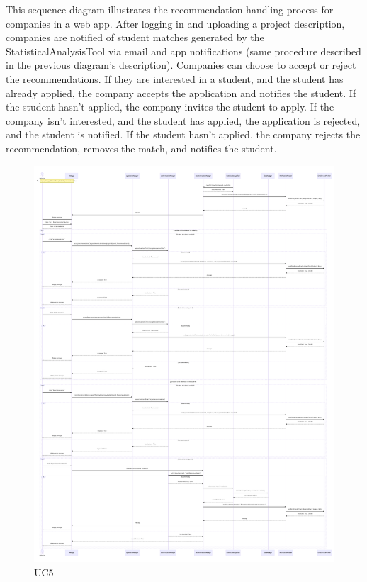 This sequence diagram illustrates the recommendation handling process for companies in a web app. After logging in and uploading a project description, companies are notified of student matches generated by the StatisticalAnalysisTool via email and app notifications (same procedure described in the previous diagram's description). Companies can choose to accept or reject the recommendations. If they are interested in a student, and the student has already applied, the company accepts the application and notifies the student. If the student hasn’t applied, the company invites the student to apply. If the company isn’t interested, and the student has applied, the application is rejected, and the student is notified. If the student hasn’t applied, the company rejects the recommendation, removes the match, and notifies the student.
\begin{figure}[H]
    \centering
    \hspace{-1 cm} %
    \includegraphics[width=1\linewidth]{DD//Images/SequenceDiagrams/UC5.pdf}
    \caption{UC5}
\end{figure}

